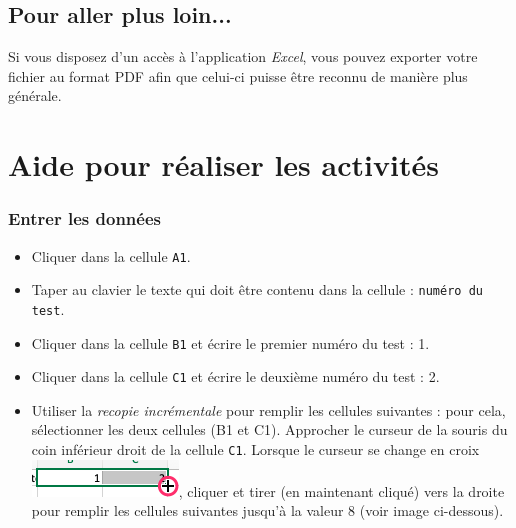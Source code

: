\subsection{Pour aller plus loin...}

Si vous disposez d'un accès à l'application \emph{Excel}, vous pouvez exporter votre fichier au format PDF afin que celui-ci puisse être reconnu de manière plus générale.



%
%
%
%

\newpage

\section{Aide pour réaliser les activités}\label{aideExcel}

\subsubsection{Entrer les données}

\begin{itemize}
\item Cliquer dans la cellule \texttt{A1}.
\item Taper au clavier le texte qui doit être contenu dans la cellule : \texttt{numéro du test}.
\item Cliquer dans la cellule \texttt{B1} et écrire le premier numéro du test : 1.
\item Cliquer dans la cellule \texttt{C1} et écrire le deuxième numéro du test : 2.
\item Utiliser la \emph{recopie incrémentale} pour remplir les cellules suivantes : pour cela, sélectionner les deux cellules (B1 et C1). Approcher le curseur de la souris du coin inférieur droit de la cellule \texttt{C1}. Lorsque le curseur se change en croix
\includegraphics[scale=.4]{./images/tableur/recopieIncrementale_Excel_crop}, cliquer et tirer (en maintenant cliqué) vers la droite pour remplir les cellules suivantes jusqu'à la valeur 8 (voir image ci-dessous).
\end{itemize}


